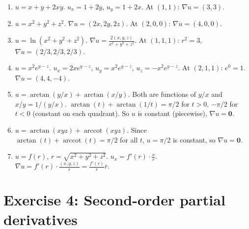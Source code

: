 \documentclass[12pt,a4paper]{article}
\begin{document}
\begin{enumerate}[leftmargin=*, label=(\alph*)]

\item $u=x+y+2xy$. $u_x=1+2y$, $u_y=1+2x$. At $(1,1)$: $\nabla u=(3,3)$.

\item $u=x^2+y^2+z^2$. $\nabla u=(2x,2y,2z)$. At $(2,0,0)$: $\nabla u=(4,0,0)$.

\item $u=\ln(x^2+y^2+z^2)$. $\nabla u=\frac{2(x,y,z)}{x^2+y^2+z^2}$. At $(1,1,1)$: $r^2=3$, $\nabla u=(2/3,2/3,2/3)$.

\item $u=x^2e^{y-z}$. $u_x=2xe^{y-z}$, $u_y=x^2e^{y-z}$, $u_z=-x^2e^{y-z}$.
At $(2,1,1)$: $e^0=1$. $\nabla u=(4,4,-4)$.

\item $u=\arctan(y/x)+\arctan(x/y)$. Both are functions of $y/x$ and $x/y=1/(y/x)$.
$\arctan(t)+\arctan(1/t)=\pi/2$ for $t>0$, $-\pi/2$ for $t<0$ (constant on each quadrant).
So $u$ is constant (piecewise), $\nabla u=\mathbf{0}$.

\item $u=\arctan(xyz)+\operatorname{arccot}(xyz)$. Since $\arctan(t)+\operatorname{arccot}(t)=\pi/2$ for all $t$, $u=\pi/2$ is constant, so $\nabla u=\mathbf{0}$.

\item $u=f(r)$, $r=\sqrt{x^2+y^2+z^2}$. $u_x=f'(r)\cdot\frac{x}{r}$.
$\nabla u=f'(r)\cdot\frac{(x,y,z)}{r}=\frac{f'(r)}{r}\bar{r}$.

\end{enumerate}

\section*{Exercise 4: Second-order partial derivatives}
\end{document}
